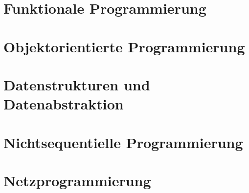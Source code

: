 \chapter{Funktionale Programmierung}
\chapter{Objektorientierte Programmierung}
\chapter{Datenstrukturen und Datenabstraktion}

\chapter{Nichtsequentielle Programmierung}
\chapter{Netzprogrammierung}
